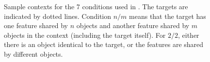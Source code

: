 \begin{figure}[h]

  
  \caption{Sample contexts for the 7 conditions used in \cite{Frank}. 
  The targets are indicated by dotted lines. 
  Condition $n/m$ means that the target has one feature shared 
  by $n$ objects and another feature shared by $m$ objects in the context
  (including the target itself).
  For $2/2$, either there is an object identical to the target, or the features are shared by different objects.}
\end{figure}


